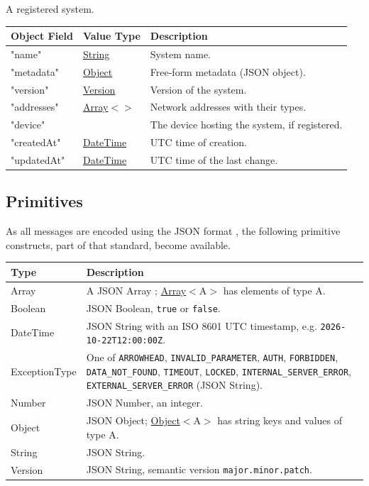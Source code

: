 \documentclass[a4paper]{arrowhead}
\newcommand{\mref}[2][]{{\textcolor{ArrowheadPurple}{\hyperref[sec:model:#2]{\ifstrempty{#1}{#2}{#1}}}}}
\newcommand{\pdef}[1]{{\textcolor{ArrowheadGrey}{#1 \label{sec:model:primitives:#1} \label{sec:model:primitives:#1s}}}}
\newcommand{\pref}[1]{{\textcolor{ArrowheadGrey}{\hyperref[sec:model:primitives:#1]{#1}}}}
\begin{document}

A registered system.


\noindent\begin{tabularx}{\textwidth}{| >{\raggedright\arraybackslash}p{3.9cm} | >{\raggedright\arraybackslash\small}p{5.3cm} | X |} \hline
\rowcolor{gray!33} Object Field & Value Type & Description \\ \hline
"name" & \pref{String} & System name. \\ \hline
"metadata" & \pref{Object} & Free-form metadata (JSON object). \\ \hline
"version" & \pref{Version} & Version of the system. \\ \hline
"addresses" & \pref{Array}$<$\allowbreak{}\mref{Address}$>$ & Network addresses with their types. \\ \hline
"device" & \mref{DeviceResponse} & The device hosting the system, if registered. \\ \hline
"created\allowbreak{}At" & \pref{DateTime} & UTC time of creation. \\ \hline
"updated\allowbreak{}At" & \pref{DateTime} & UTC time of the last change. \\ \hline
\end{tabularx}



\subsection{Primitives}
\label{sec:model:primitives}

As all messages are encoded using the JSON format \cite{rfc8259}, the following primitive constructs, part of that standard, become available.

\noindent\begin{tabularx}{\textwidth}{| p{4.6cm} | X |} \hline
\rowcolor{gray!33} Type & Description \\ \hline
\pdef{Array} & A JSON Array \cite{rfc8259}; \pref{Array}$<$A$>$ has elements of type A. \\ \hline
\pdef{Boolean} & JSON Boolean, \texttt{true} or \texttt{false}. \\ \hline
\pdef{DateTime} & JSON String with an ISO 8601 UTC timestamp, e.g. \texttt{2026-10-22T12:00:00Z}. \\ \hline
\pdef{ExceptionType} & One of \texttt{ARROWHEAD}, \texttt{INVALID\_\allowbreak{}PARAMETER}, \texttt{AUTH}, \texttt{FORBIDDEN}, \texttt{DATA\_\allowbreak{}NOT\_\allowbreak{}FOUND}, \texttt{TIMEOUT}, \texttt{LOCKED}, \texttt{INTERNAL\_\allowbreak{}SERVER\_\allowbreak{}ERROR}, \texttt{EXTERNAL\_\allowbreak{}SERVER\_\allowbreak{}ERROR} (JSON String). \\ \hline
\pdef{Number} & JSON Number, an integer. \\ \hline
\pdef{Object} & JSON Object; \pref{Object}$<$A$>$ has string keys and values of type A. \\ \hline
\pdef{String} & JSON String. \\ \hline
\pdef{Version} & JSON String, semantic version \texttt{major.minor.patch}. \\ \hline
\end{tabularx}
\end{document}
